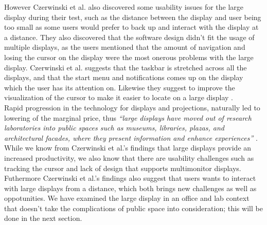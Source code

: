 However Czerwinski et al. \cite{Czerwinski:2003} also discovered some usability issues for the large display during their test, such as the distance between the display and user being too small as some users would prefer to back up and interact with the display at a distance. They also discovered that the software design didn't fit the usage of multiple displays, as the users mentioned that the amount of navigation and losing the cursor on the display were the most onerous problems with the large display.
Czerwinski et al. suggests that the taskbar is stretched across all the displays, and that the start menu and notifications comes up on the display which the user has its attention on. Likewise they suggest to improve the  visualization of the cursor to make it easier to locate on a large display \cite{Czerwinski:2003}.\\

Rapid progression in the technology for displays and projections, naturally led to lowering of the marginal price, thus \emph{``large displays have moved out of research laboratories into public spaces such as museums, libraries, plazas, and architectural facades, where they present information and enhance experiences''} \cite{Hinrichs:2013:IPD:2478559.2478965}.  %
While we know from Czerwinski et al.'s \cite{Czerwinski:2003} findings  that large displays provide an increased productivity, we also know that there are usability challenges such as tracking the cursor and lack of design that supports multimonitor displays. Futhermore Czerwinski et al.'s findings also suggest that users wants to interact with large displays from a distance, which both brings new challenges as well as oppotunities. We have examined the large display in an office and lab context that  doesn't take the complications of public space into consideration; this will be done in the next section.
